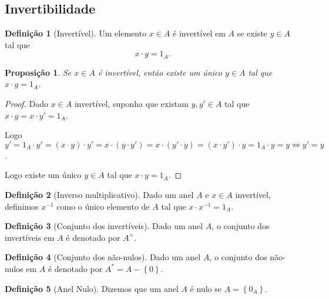 \documentclass{article}
\newtheorem{prop}{Proposição}[section]
\theoremstyle{theorem}
\theoremstyle{lemma}
\theoremstyle{definition}
\newtheorem{definicao}{Definição}[section]
\theoremstyle{remark}
\begin{document}
\subsection{Invertibilidade}
\begin{definicao}[Invertível]
	Um elemento $x\in A$ é invertível em $A$ se existe $y\in A$ tal que $$x \cdot y = 1_A.$$
\end{definicao}
\begin{prop}
	Se $x\in A$ é invertível, então existe um único $y\in A$ tal que $x\cdot y = 1_A$.
\end{prop}
\begin{proof}
	Dado $x\in A$ invertível, suponha que existam $y,y' \in A$ tal que $x\cdot y = x\cdot y' = 1_A$.

	Logo $y' = 1_A \cdot y' = (x\cdot y) \cdot y' =  x\cdot (y\cdot y') = x\cdot (y'\cdot y) = (x \cdot y')\cdot y = 1_A \cdot y =y \iff y' = y$.

	Logo existe um único $y\in A$ tal que $x\cdot y = 1_A$.
\end{proof}
\begin{definicao}[Inverso multiplicativo]
	Dado um anel $A$ e $x\in A$ invertível, definimos $x^{-1}$ como o único elemento de $A$ tal que $x\cdot x^{-1} = 1_A$.
\end{definicao}

\begin{definicao}[Conjunto dos invertíveis]
	Dado um anel $A$, o conjunto dos invertíveis em $A$ é denotado por $A^{\times}$.
\end{definicao}
\begin{definicao}[Conjunto dos não-nulos]
	Dado um anel $A$, o conjunto dos não-nulos em $A$ é denotado por $A^{*} = A - \left\{0\right\}$.
\end{definicao}
\begin{definicao}[Anel Nulo]
	Dizemos que um anel $A$ é nulo se $A = \left\{ 0_A \right\}$.
\end{definicao}
\end{document}
